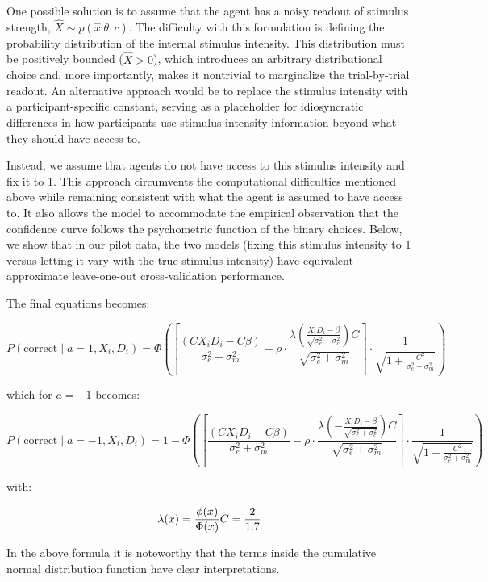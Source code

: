 \documentclass[
]{article}
\begin{document}
One possible solution is to assume that the agent has a noisy readout of
stimulus strength, \(\hat{X} \sim p(\hat{x}|\theta,c)\). The difficulty
with this formulation is defining the probability distribution of the
internal stimulus intensity. This distribution must be positively
bounded (\(\hat{X} > 0\)), which introduces an arbitrary distributional
choice and, more importantly, makes it nontrivial to marginalize the
trial-by-trial readout. An alternative approach would be to replace the
stimulus intensity with a participant-specific constant, serving as a
placeholder for idiosyncratic differences in how participants use
stimulus intensity information beyond what they should have access to.

Instead, we assume that agents do not have access to this stimulus
intensity and fix it to 1. This approach circumvents the computational
difficulties mentioned above while remaining consistent with what the
agent is assumed to have access to. It also allows the model to
accommodate the empirical observation that the confidence curve follows
the psychometric function of the binary choices. Below, we show that in
our pilot data, the two models (fixing this stimulus intensity to 1
versus letting it vary with the true stimulus intensity) have equivalent
approximate leave-one-out cross-validation performance.

The final equations becomes:

\[
P(\text{correct} \mid a = 1, X_i, D_i) = \Phi\left(\left[\frac{(CX_iD_i - C\beta)}{\sigma_e^2 + \sigma_m^2} + \rho \cdot \frac{ \lambda\left(\frac{X_iD_i - \beta}{\sqrt{\sigma_e^2 + \sigma_c^2}}\right)C}{\sqrt{\sigma_e^2 + \sigma_m^2} }\right] \cdot\frac{1} {\sqrt{1 + \frac{C^2}{\sigma_e^2+\sigma_m^2}}}\right) \tag{7a}
\]

which for \(a = -1\) becomes:

\[
P(\text{correct} \mid a = -1, X_i, D_i) = 1-\Phi\left(\left[\frac{(CX_iD_i - C\beta)}{\sigma_e^2 + \sigma_m^2} - \rho \cdot \frac{ \lambda\left(-\frac{X_iD_i - \beta}{\sqrt{\sigma_e^2 + \sigma_c^2}}\right)C}{\sqrt{\sigma_e^2 + \sigma_m^2} }\right] \cdot\frac{1} {\sqrt{1 + \frac{C^2}{\sigma_e^2+\sigma_m^2}}}\right) \tag{7b}
\]

with:

\[
\lambda(x) = \frac{\phi(x)}{\Phi(x)} \\
C = \frac{2}{1.7}
\]

In the above formula it is noteworthy that the terms inside the
cumulative normal distribution function have clear interpretations.
\end{document}
